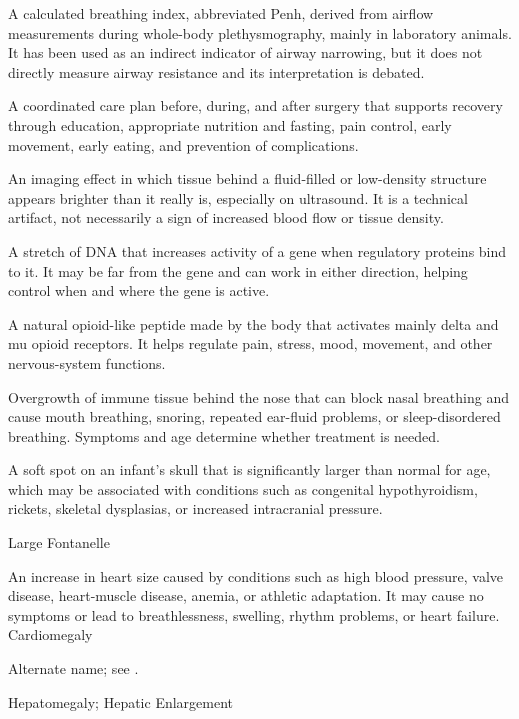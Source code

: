  A calculated breathing index, abbreviated Penh, derived from airflow measurements during whole-body plethysmography, mainly in laboratory animals. It has been used as an indirect indicator of airway narrowing, but it does not directly measure airway resistance and its interpretation is debated.

 A coordinated care plan before, during, and after surgery that supports recovery through education, appropriate nutrition and fasting, pain control, early movement, early eating, and prevention of complications.

 An imaging effect in which tissue behind a fluid-filled or low-density structure appears brighter than it really is, especially on ultrasound. It is a technical artifact, not necessarily a sign of increased blood flow or tissue density.

 A stretch of DNA that increases activity of a gene when regulatory proteins bind to it. It may be far from the gene and can work in either direction, helping control when and where the gene is active.

 A natural opioid-like peptide made by the body that activates mainly delta and mu opioid receptors. It helps regulate pain, stress, mood, movement, and other nervous-system functions.


 Overgrowth of immune tissue behind the nose that can block nasal breathing and cause mouth breathing, snoring, repeated ear-fluid problems, or sleep-disordered breathing. Symptoms and age determine whether treatment is needed.

 A soft spot on an infant's skull that is significantly larger than normal for age, which may be associated with conditions such as congenital hypothyroidism, rickets, skeletal dysplasias, or increased intracranial pressure.

\synonyms
Large Fontanelle

 An increase in heart size caused by conditions such as high blood pressure, valve disease, heart-muscle disease, anemia, or athletic adaptation. It may cause no symptoms or lead to breathlessness, swelling, rhythm problems, or heart failure.
\synonyms
Cardiomegaly

 Alternate name; see .

\synonyms
Hepatomegaly; Hepatic Enlargement

